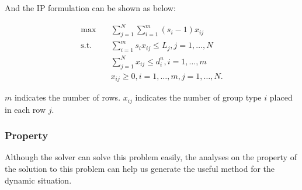 

And the IP formulation can be shown as below:


\begin{equation}\label{deter_upper}
    \begin{aligned}
      \max \quad & \sum_{j =1}^{N} \sum_{i = 1}^{m} (s_i -1) x_{ij} \\
      \text {s.t.} \quad & \sum_{i = 1}^{m} s_i x_{ij} \leq L_{j}, j=1,\ldots,N \\
      & \sum_{j =1}^{N} x_{ij} \leq d_{i}^{u}, i=1,\ldots,m \\
      & x_{ij} \geq 0, i=1,\ldots,m, j=1,\ldots,N.
    \end{aligned}
\end{equation}

$m$ indicates the number of rows. $x_{ij}$ indicates the number of group type $i$ placed in each row $j$.

\subsubsection{Property}

Although the solver can solve this problem easily, the analyses on the property of the solution to this problem can help us generate the useful method for the dynamic situation. 

